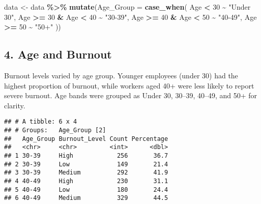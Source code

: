 \documentclass[
]{article}
\newenvironment{Shaded}{\begin{snugshade}}{\end{snugshade}}
\newcommand{\AttributeTok}[1]{\textcolor[rgb]{0.13,0.29,0.53}{#1}}
\newcommand{\DecValTok}[1]{\textcolor[rgb]{0.00,0.00,0.81}{#1}}
\newcommand{\FunctionTok}[1]{\textcolor[rgb]{0.13,0.29,0.53}{\textbf{#1}}}
\newcommand{\NormalTok}[1]{#1}
\newcommand{\OtherTok}[1]{\textcolor[rgb]{0.56,0.35,0.01}{#1}}
\newcommand{\SpecialCharTok}[1]{\textcolor[rgb]{0.81,0.36,0.00}{\textbf{#1}}}
\newcommand{\StringTok}[1]{\textcolor[rgb]{0.31,0.60,0.02}{#1}}
\begin{document}
\begin{Shaded}
\begin{Highlighting}[]
\NormalTok{data }\OtherTok{\textless{}{-}}\NormalTok{ data }\SpecialCharTok{\%\textgreater{}\%} 
  \FunctionTok{mutate}\NormalTok{(}\AttributeTok{Age\_Group =} \FunctionTok{case\_when}\NormalTok{(}
\NormalTok{    Age }\SpecialCharTok{\textless{}} \DecValTok{30} \SpecialCharTok{\textasciitilde{}} \StringTok{"Under 30"}\NormalTok{,}
\NormalTok{    Age }\SpecialCharTok{\textgreater{}=} \DecValTok{30} \SpecialCharTok{\&}\NormalTok{ Age }\SpecialCharTok{\textless{}} \DecValTok{40} \SpecialCharTok{\textasciitilde{}} \StringTok{"30{-}39"}\NormalTok{,}
\NormalTok{    Age }\SpecialCharTok{\textgreater{}=} \DecValTok{40} \SpecialCharTok{\&}\NormalTok{ Age }\SpecialCharTok{\textless{}} \DecValTok{50} \SpecialCharTok{\textasciitilde{}} \StringTok{"40{-}49"}\NormalTok{,}
\NormalTok{    Age }\SpecialCharTok{\textgreater{}=} \DecValTok{50} \SpecialCharTok{\textasciitilde{}} \StringTok{"50+"}
\NormalTok{  ))}
\end{Highlighting}
\end{Shaded}

\subsection{\texorpdfstring{\textbf{4. Age and
Burnout}}{4. Age and Burnout}}\label{age-and-burnout}

Burnout levels varied by age group. Younger employees (under 30) had the
highest proportion of burnout, while workers aged 40+ were less likely
to report severe burnout. Age bands were grouped as Under 30, 30--39,
40--49, and 50+ for clarity.

\begin{verbatim}
## # A tibble: 6 x 4
## # Groups:   Age_Group [2]
##   Age_Group Burnout_Level Count Percentage
##   <chr>     <chr>         <int>      <dbl>
## 1 30-39     High            256       36.7
## 2 30-39     Low             149       21.4
## 3 30-39     Medium          292       41.9
## 4 40-49     High            230       31.1
## 5 40-49     Low             180       24.4
## 6 40-49     Medium          329       44.5
\end{verbatim}
\end{document}
